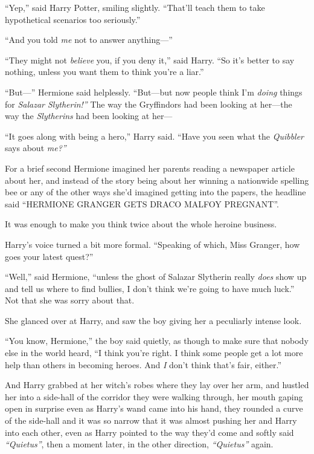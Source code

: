 ``Yep,'' said Harry Potter, smiling slightly. ``That'll teach them to
take hypothetical scenarios too seriously.''

``And you told \emph{me} not to answer anything---''

``They might not \emph{believe} you, if you deny it,'' said Harry. ``So
it's better to say nothing, unless you want them to think you're a
liar.''

``But---'' Hermione said helplessly. ``But---but now people think I'm
\emph{doing} things for \emph{Salazar Slytherin!''} The way the
Gryffindors had been looking at her---the way the \emph{Slytherins} had
been looking at her---

``It goes along with being a hero,'' Harry said. ``Have you seen what
the \emph{Quibbler} says about \emph{me?''}

For a brief second Hermione imagined her parents reading a newspaper
article about her, and instead of the story being about her winning a
nationwide spelling bee or any of the other ways she'd imagined getting
into the papers, the headline said ``HERMIONE GRANGER GETS DRACO MALFOY
PREGNANT''.

It was enough to make you think twice about the whole heroine business.

Harry's voice turned a bit more formal. ``Speaking of which, Miss
Granger, how goes your latest quest?''

``Well,'' said Hermione, ``unless the ghost of Salazar Slytherin really
\emph{does} show up and tell us where to find bullies, I don't think
we're going to have much luck.'' Not that she was sorry about that.

She glanced over at Harry, and saw the boy giving her a peculiarly
intense look.

``You know, Hermione,'' the boy said quietly, as though to make sure
that nobody else in the world heard, ``I think you're right. I think
some people get a lot more help than others in becoming heroes. And
\emph{I} don't think that's fair, either.''

And Harry grabbed at her witch's robes where they lay over her arm, and
hustled her into a side-hall of the corridor they were walking through,
her mouth gaping open in surprise even as Harry's wand came into his
hand, they rounded a curve of the side-hall and it was so narrow that it
was almost pushing her and Harry into each other, even as Harry pointed
to the way they'd come and softly said \emph{``Quietus''}, then a moment
later, in the other direction, \emph{``Quietus''} again.

